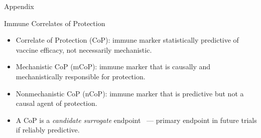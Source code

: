 \documentclass{beamer}
\begin{document}

\appendix
\begin{frame}[standout]
  Appendix
\end{frame}


\begin{frame}[c]{Immune Correlates of
  Protection~\citep{plotkin2012nomenclature}}

\begin{center}
\begin{itemize}
  \itemsep8pt
  \item Correlate of Protection (CoP): immune marker statistically predictive
    of vaccine efficacy, not necessarily mechanistic.
  \item Mechanistic CoP (mCoP): immune marker that is causally and
    mechanistically responsible for protection.
  \item Nonmechanistic CoP (nCoP): immune marker that is predictive but not a
    causal agent of protection.
  \item A CoP is a \textit{candidate surrogate}
      endpoint~\citep{prentice1989surrogate} --- primary
      endpoint in future trials if reliably predictive.
\end{itemize}
\end{center}

\note{
}

\end{frame}

\end{document}
